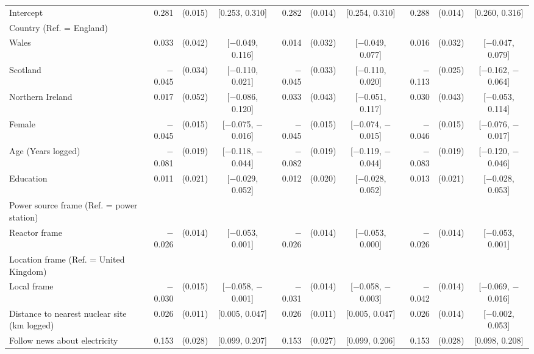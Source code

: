 \begin{landscape}
\begin{longtable}[t]{>{\raggedright\arraybackslash}p{2.8in}rrcrrcrrc}
\endfoot
\bottomrule
\endlastfoot
Intercept & 0.281 & (0.015) & {}[0.253, 0.310] & 0.282 & (0.014) & {}[0.254, 0.310] & 0.288 & (0.014) & {}[0.260, 0.316]\\
Country (Ref. = England) &  &  &  &  &  &  &  &  & \\
\hspace{1em}Wales & 0.033 & (0.042) & {}[$-$0.049, 0.116] & 0.014 & (0.032) & {}[$-$0.049, 0.077] & 0.016 & (0.032) & {}[$-$0.047, 0.079]\\
\hspace{1em}Scotland & $-$0.045 & (0.034) & {}[$-$0.110, 0.021] & $-$0.045 & (0.033) & {}[$-$0.110, 0.020] & $-$0.113 & (0.025) & {}[$-$0.162, $-$0.064]\\
\hspace{1em}Northern Ireland & 0.017 & (0.052) & {}[$-$0.086, 0.120] & 0.033 & (0.043) & {}[$-$0.051, 0.117] & 0.030 & (0.043) & {}[$-$0.053, 0.114]\\
Female & $-$0.045 & (0.015) & {}[$-$0.075, $-$0.016] & $-$0.045 & (0.015) & {}[$-$0.074, $-$0.015] & $-$0.046 & (0.015) & {}[$-$0.076, $-$0.017]\\
Age (Years logged) & $-$0.081 & (0.019) & {}[$-$0.118, $-$0.044] & $-$0.082 & (0.019) & {}[$-$0.119, $-$0.044] & $-$0.083 & (0.019) & {}[$-$0.120, $-$0.046]\\
Education & 0.011 & (0.021) & {}[$-$0.029, 0.052] & 0.012 & (0.020) & {}[$-$0.028, 0.052] & 0.013 & (0.021) & {}[$-$0.028, 0.053]\\
Power source frame (Ref. = power station) &  &  &  &  &  &  &  &  & \\
\hspace{1em}Reactor frame & $-$0.026 & (0.014) & {}[$-$0.053, 0.001] & $-$0.026 & (0.014) & {}[$-$0.053, 0.000] & $-$0.026 & (0.014) & {}[$-$0.053, 0.001]\\
Location frame (Ref. = United Kingdom) &  &  &  &  &  &  &  &  & \\
\hspace{1em}Local frame & $-$0.030 & (0.015) & {}[$-$0.058, $-$0.001] & $-$0.031 & (0.014) & {}[$-$0.058, $-$0.003] & $-$0.042 & (0.014) & {}[$-$0.069, $-$0.016]\\
Distance to nearest nuclear site (km logged) & 0.026 & (0.011) & {}[0.005, 0.047] & 0.026 & (0.011) & {}[0.005, 0.047] & 0.026 & (0.014) & {}[$-$0.002, 0.053]\\
Follow news about electricity & 0.153 & (0.028) & {}[0.099, 0.207] & 0.153 & (0.027) & {}[0.099, 0.206] & 0.153 & (0.028) & {}[0.098, 0.208]\\

\end{longtable}
\end{landscape}

